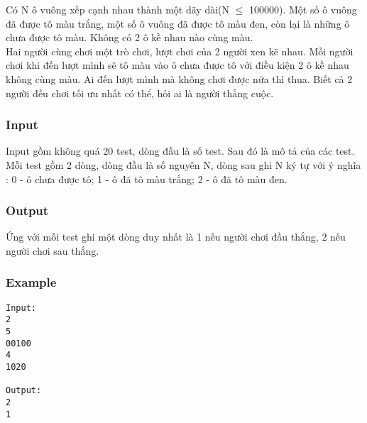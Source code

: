 



   Có N ô vuông xếp cạnh nhau thành một dãy dài(N $\le$ 100000). Một số ô vuông đã được tô màu trắng, một số ô vuông đã được tô màu đen, còn lại là những ô chưa được tô màu. Không có 2 ô kề nhau nào cùng màu.   
\\   Hai người cùng chơi một trò chơi, lượt chơi của 2 người xen kẽ nhau. Mỗi người chơi khi đến lượt mình sẽ tô màu vào ô chưa được tô với điều kiện 2 ô kề nhau không cùng màu. Ai đến lượt mình mà không chơi được nữa thì thua. Biết cả 2 người đều chơi tối ưu nhất có thể, hỏi ai là người thắng cuộc.  

\subsubsection{   Input  }

   Input gồm không quá 20 test, dòng đầu là số test. Sau đó là mô tả của các test.   
\\   Mỗi test gồm 2 dòng, dòng đầu là số nguyên N, dòng sau ghi N ký tự với ý nghĩa : 0 - ô chưa được tô; 1 - ô đã tô màu trắng; 2 - ô đã tô màu đen.  

\subsubsection{   Output  }

   Ứng với mỗi test ghi một dòng duy nhất là 1 nếu người chơi đầu thắng, 2 nếu người chơi sau thắng.  

\subsubsection{   Example  }
\begin{verbatim}
Input:
2
5
00100
4
1020

Output:
2
1
\end{verbatim}
